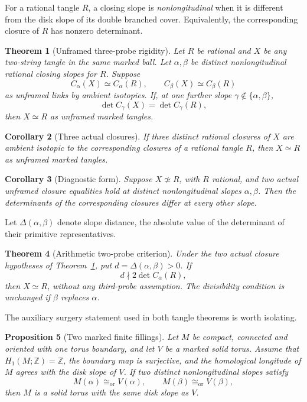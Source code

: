 \documentclass[11pt]{amsart}
\newtheorem{theorem}{Theorem}[section]
\newtheorem{proposition}[theorem]{Proposition}
\newtheorem{corollary}[theorem]{Corollary}
\theoremstyle{definition}
\theoremstyle{remark}
\newcommand{\Z}{\mathbb Z}
\newcommand{\Det}{\operatorname{det}}
\newcommand{\cl}[2]{C_{#1}(#2)}
\newcommand{\iso}{\cong_{\mathrm{or}}}
\begin{document}
For a rational tangle \(R\), a closing slope is
\emph{nonlongitudinal} when it is different from the disk slope of
its double branched cover. Equivalently, the corresponding closure
of \(R\) has nonzero determinant.

\begin{theorem}[Unframed three-probe rigidity]\label{thm:three}
Let \(R\) be rational and \(X\) be any two-string tangle in the same
marked ball. Let \(\alpha,\beta\) be distinct nonlongitudinal
rational closing slopes for \(R\). Suppose
\[
 \cl\alpha X\simeq\cl\alpha R,\qquad
 \cl\beta X\simeq\cl\beta R
\]
as unframed links by ambient isotopies. If, at one further slope
\(\gamma\notin\{\alpha,\beta\}\),
\[
 \Det\cl\gamma X=\Det\cl\gamma R,
\]
then \(X\simeq R\) as unframed marked tangles.
\end{theorem}

\begin{corollary}[Three actual closures]\label{cor:actual}
If three distinct rational closures of \(X\) are ambient isotopic
to the corresponding closures of a rational tangle \(R\), then
\(X\simeq R\) as unframed marked tangles.
\end{corollary}

\begin{corollary}[Diagnostic form]\label{cor:diagnostic}
Suppose \(X\not\simeq R\), with \(R\) rational, and two actual
unframed closure equalities hold at distinct nonlongitudinal slopes
\(\alpha,\beta\). Then the determinants of the corresponding
closures differ at every other slope.
\end{corollary}

Let \(\Delta(\alpha,\beta)\) denote slope distance, the absolute
value of the determinant of their primitive representatives.

\begin{theorem}[Arithmetic two-probe criterion]\label{thm:arithmetic}
Under the two actual closure hypotheses of
Theorem~\ref{thm:three}, put \(d=\Delta(\alpha,\beta)>0\).
If
\[
 d\nmid 2\Det\cl\alpha R,
\]
then \(X\simeq R\), without any third-probe assumption.
The divisibility condition is unchanged if \(\beta\) replaces
\(\alpha\).
\end{theorem}

The auxiliary surgery statement used in both tangle theorems is
worth isolating.

\begin{proposition}[Two marked finite fillings]\label{prop:surgery}
Let \(M\) be compact, connected and oriented with one torus
boundary, and let \(V\) be a marked solid torus. Assume that
\(H_1(M;\Z)=\Z\), the boundary map is surjective, and the
homological longitude of \(M\) agrees with the disk slope of \(V\).
If two distinct nonlongitudinal slopes satisfy
\[
 M(\alpha)\iso V(\alpha),\qquad M(\beta)\iso V(\beta),
\]
then \(M\) is a solid torus with the same disk slope as \(V\).
\end{proposition}
\end{document}
